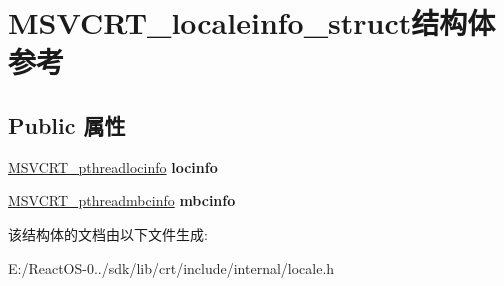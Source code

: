 \hypertarget{struct_m_s_v_c_r_t__localeinfo__struct}{}\section{M\+S\+V\+C\+R\+T\+\_\+localeinfo\+\_\+struct结构体 参考}
\label{struct_m_s_v_c_r_t__localeinfo__struct}
\subsection*{Public 属性}
\begin{DoxyCompactItemize}
\item 
\mbox{\label{struct_m_s_v_c_r_t__localeinfo__struct_ac0834ba50584a3568c49dd6f122dfca7}} 
\hyperlink{struct_m_s_v_c_r_t__threadlocaleinfostruct}{M\+S\+V\+C\+R\+T\+\_\+pthreadlocinfo} {\bfseries locinfo}
\item 
\mbox{\label{struct_m_s_v_c_r_t__localeinfo__struct_a5acc8e107ac8a6d83a1af24502e44c59}} 
\hyperlink{struct_m_s_v_c_r_t__threadmbcinfostruct}{M\+S\+V\+C\+R\+T\+\_\+pthreadmbcinfo} {\bfseries mbcinfo}
\end{DoxyCompactItemize}


该结构体的文档由以下文件生成\+:\begin{DoxyCompactItemize}
\item 
E\+:/\+React\+O\+S-\/0../sdk/lib/crt/include/internal/locale.\+h\end{DoxyCompactItemize}
